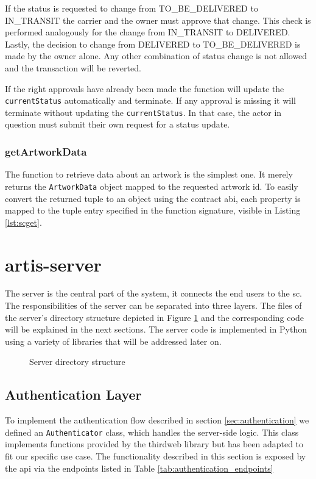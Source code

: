 If the status is requested to change from TO\_BE\_DELIVERED to IN\_TRANSIT the carrier and the owner must approve that change. This check is performed analogously for the change from IN\_TRANSIT to DELIVERED. Lastly, the decision to change from DELIVERED to TO\_BE\_DELIVERED is made by the owner alone. Any other combination of status change is not allowed and the transaction will be reverted.

If the right approvals have already been made the function will update the \texttt{currentStatus} automatically and terminate. If any approval is missing it will terminate without updating the \texttt{currentStatus}. In that case, the actor in question must submit their own request for a status update.

\subsubsection{getArtworkData}
The function to retrieve data about an artwork is the simplest one. It merely returns the \texttt{ArtworkData} object mapped to the requested artwork id. To easily convert the returned tuple to an object using the contract \gls{abi}, each property is mapped to the tuple entry specified in the function signature, visible in Listing \ref{lst:scget}.



\clearpage
\section{artis-server}
The server is the central part of the system, it connects the end users to the \gls{sc}. The responsibilities of the server can be separated into three layers. The files of the server's directory structure depicted in Figure \ref{fig:server_directory_structure} and the corresponding code will be explained in the next sections. The server code is implemented in Python using a variety of libraries that will be addressed later on.

\begin{figure}
    \centering
        
    \caption{Server directory structure}
    \label{fig:server_directory_structure}
\end{figure}

\subsection{Authentication Layer}
\label{sec:authentication_layer}
To implement the authentication flow described in section \ref{sec:authentication} we defined an \texttt{Authenticator} class, which handles the server-side logic. This class implements functions provided by the thirdweb library \cite{thirdweb} but has been adapted to fit our specific use case. The functionality described in this section is exposed by the \gls{api} via the endpoints listed in Table \ref{tab:authentication_endpoints}

